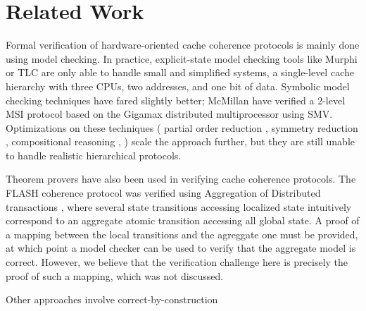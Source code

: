 \section{Related Work}
\label{relatedWork}

Formal verification of hardware-oriented cache coherence protocols is mainly
done using model checking. In practice, explicit-state model checking tools like
Murphi \cite{murphi} or TLC \cite{tlc} are only able to handle small and
simplified systems, \eg{} a single-level cache hierarchy with three CPUs, two
addresses, and one bit of data. Symbolic model checking techniques have fared
slightly better; McMillan \etal{} have verified a 2-level MSI protocol based on
the Gigamax distributed multiprocessor using SMV.  Optimizations on these techniques
(\eg{} partial order reduction \cite{part}, symmetry reduction \cite{sym1,
  sym2}, compositional reasoning \cite{somethink}, \etc{}) scale the approach
further, but they are still unable to handle realistic hierarchical protocols.

Theorem provers have also been used in verifying cache coherence protocols. The
FLASH coherence protocol \cite{flash} was verified using Aggregation of
Distributed  transactions \cite{park}, where several state transitions accessing
localized state intuitively correspond to an aggregate atomic transition
accessing all global state. A proof of a mapping between the local transitions
and the agreggate one must be provided, at which point a model checker can
be used to verify that the aggregate model is correct. However, we believe that the
verification challenge here is precisely the proof of such a mapping, which was
not discussed.

Other approaches involve correct-by-construction


